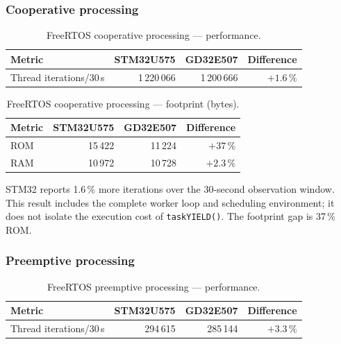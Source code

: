 \subsubsection{Cooperative processing}
\label{sec:gd32-freertos-coop}

\begin{table}[H]
  \centering
  \caption{FreeRTOS cooperative processing --- performance.}
  \label{tab:gd32-freertos-coop-perf}
  \begin{tabular}{l r r r}
    \toprule
    \textbf{Metric} & \textbf{STM32U575} & \textbf{GD32E507} & \textbf{Difference} \\
    \midrule
    Thread iterations/30\,s & 1\,220\,066 & 1\,200\,666 & $+1.6\,\%$ \\
    \bottomrule
  \end{tabular}
\end{table}

\begin{table}[H]
  \centering
  \caption{FreeRTOS cooperative processing --- footprint (bytes).}
  \label{tab:gd32-freertos-coop-fp}
  \begin{tabular}{l r r r}
    \toprule
    \textbf{Metric} & \textbf{STM32U575} & \textbf{GD32E507} & \textbf{Difference} \\
    \midrule
    ROM & 15\,422 & 11\,224 & $+37\,\%$ \\
    RAM & 10\,972 & 10\,728 & $+2.3\,\%$ \\
    \bottomrule
  \end{tabular}
\end{table}

STM32 reports 1.6\,\% more iterations over the 30-second observation window. This result
includes the complete worker loop and scheduling environment; it does not isolate the
execution cost of \texttt{taskYIELD()}. The footprint gap is 37\,\% ROM.

\subsubsection{Preemptive processing}
\label{sec:gd32-freertos-preemptive}

\begin{table}[H]
  \centering
  \caption{FreeRTOS preemptive processing --- performance.}
  \label{tab:gd32-freertos-preemptive-perf}
  \begin{tabular}{l r r r}
    \toprule
    \textbf{Metric} & \textbf{STM32U575} & \textbf{GD32E507} & \textbf{Difference} \\
    \midrule
    Thread iterations/30\,s & 294\,615 & 285\,144 & $+3.3\,\%$ \\
    \bottomrule
  \end{tabular}
\end{table}

